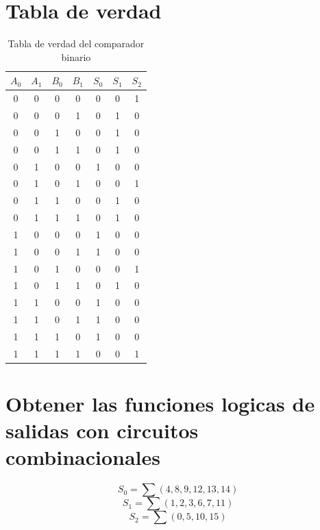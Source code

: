 \documentclass[12pt,a4paper]{report}
\begin{document}
\section{Tabla de verdad}

\begin{table}[h]
  \centering
  \begin{tabular}{cccc|ccc}
    $A_0$ & $A_1$ & $B_0$ & $B_1$ & $S_0$ & $S_1$ & $S_2$\\
    \hline
    0 & 0 & 0 & 0 & 0 & 0 & 1\\
    0 & 0 & 0 & 1 & 0 & 1 & 0\\
    0 & 0 & 1 & 0 & 0 & 1 & 0\\
    0 & 0 & 1 & 1 & 0 & 1 & 0\\
    0 & 1 & 0 & 0 & 1 & 0 & 0\\
    0 & 1 & 0 & 1 & 0 & 0 & 1\\
    0 & 1 & 1 & 0 & 0 & 1 & 0\\
    0 & 1 & 1 & 1 & 0 & 1 & 0\\
    1 & 0 & 0 & 0 & 1 & 0 & 0\\
    1 & 0 & 0 & 1 & 1 & 0 & 0\\
    1 & 0 & 1 & 0 & 0 & 0 & 1\\
    1 & 0 & 1 & 1 & 0 & 1 & 0\\
    1 & 1 & 0 & 0 & 1 & 0 & 0\\
    1 & 1 & 0 & 1 & 1 & 0 & 0\\
    1 & 1 & 1 & 0 & 1 & 0 & 0\\
    1 & 1 & 1 & 1 & 0 & 0 & 1\\
  \end{tabular}
  \caption{Tabla de verdad del comparador binario}
\end{table}

\section{Obtener las funciones logicas de salidas con circuitos combinacionales}

\begin{equation*}
  S_0=\sum(4,8,9,12,13,14)
\end{equation*}
\begin{equation*}
  S_1=\sum(1,2,3,6,7,11)
\end{equation*}
\begin{equation*}
  S_2=\sum(0,5,10,15)
\end{equation*}
\end{document}
